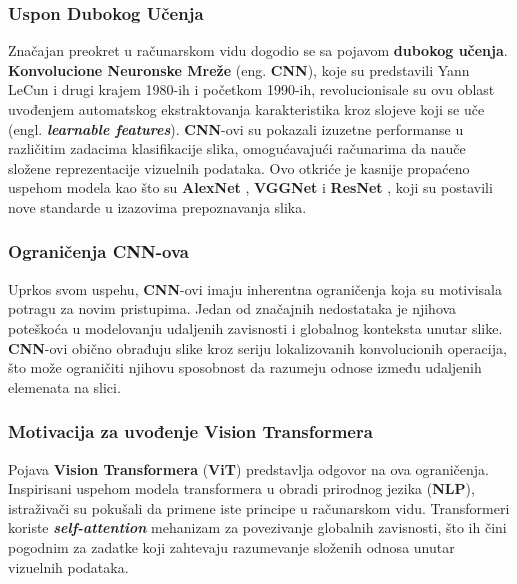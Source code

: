 \documentclass[12pt]{article}
\begin{document}
   \subsubsection{Uspon Dubokog Učenja}

   Značajan preokret u računarskom vidu dogodio se sa pojavom \textbf{dubokog učenja}. 
   \textbf{Konvolucione Neuronske Mreže} (eng. \textbf{CNN}), koje su predstavili Yann LeCun i drugi \cite{lecun_cnn} 
   krajem 1980-ih i početkom 1990-ih, revolucionisale su ovu oblast uvođenjem automatskog 
   ekstraktovanja karakteristika kroz slojeve koji se uče (engl. \textbf{\textit{learnable features}}). \textbf{CNN}-ovi su pokazali izuzetne 
   performanse u različitim zadacima klasifikacije slika, omogućavajući računarima da 
   nauče složene reprezentacije vizuelnih podataka. Ovo otkriće je kasnije propaćeno uspehom modela 
   kao što su \textbf{AlexNet} \cite{alexnet}, \textbf{VGGNet} \cite{vgg} i \textbf{ResNet} \cite{resnet}, koji su postavili nove standarde u izazovima 
   prepoznavanja slika.

   \subsubsection{Ograničenja CNN-ova}

   Uprkos svom uspehu, \textbf{CNN}-ovi imaju inherentna ograničenja 
   koja su motivisala potragu za novim pristupima. Jedan od 
   značajnih nedostataka je njihova poteškoća u modelovanju udaljenih zavisnosti
   i globalnog konteksta unutar slike. \textbf{CNN}-ovi obično obrađuju slike kroz seriju 
   lokalizovanih konvolucionih operacija, što može ograničiti njihovu sposobnost da 
   razumeju odnose između udaljenih elemenata na slici.

   \subsubsection{Motivacija za uvođenje Vision Transformera}

   Pojava \textbf{Vision Transformera} (\textbf{ViT}) predstavlja odgovor na ova ograničenja. 
   Inspirisani uspehom modela transformera u obradi prirodnog jezika (\textbf{NLP}), 
   istraživači su pokušali da primene iste principe u računarskom vidu. 
   Transformeri koriste \textbf{\textit{self-attention}} mehanizam za povezivanje globalnih zavisnosti, 
   što ih čini pogodnim za zadatke koji zahtevaju razumevanje 
   složenih odnosa unutar vizuelnih podataka.
   
   \newpage
\end{document}
